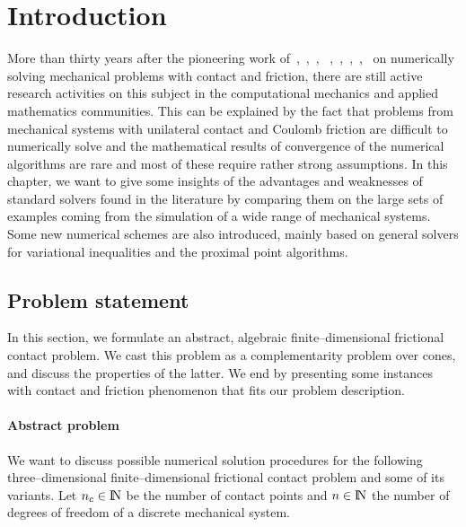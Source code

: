 \section{Introduction}



More than thirty years after the pioneering work of~\cite{Panagiotopoulos_IA1975},~\cite{Necas.ea1980},~\cite{Haslinger1983,Haslinger1984,Haslinger.Panagiotopoulos_PRSE1984}, ~\cite{z-DelPieroMaceri_CISM1983,z-DelPieroMaceri_CISM1985},~\cite{Katona_IJNAMG1983},~\cite{Chaudhary.Bathe_CS1986},~\cite{Jean.Moreau1987},~\cite{Mitsopoulou.Doudoumis1988} on numerically solving mechanical problems with contact and friction, there are still active research activities on this subject in the computational mechanics and applied mathematics communities.  This can be explained by the fact that {problems from} mechanical systems with unilateral contact and Coulomb friction are difficult to numerically solve and the mathematical results of convergence of the numerical algorithms are rare and most of these require rather strong assumptions. In this chapter, we want to give some insights of the advantages and weaknesses of standard solvers found in the literature by comparing them on the large sets of examples coming from the simulation of a wide range of mechanical systems. Some new numerical schemes are also introduced, mainly based on general solvers for variational inequalities and the proximal point algorithms.

\subsection{Problem statement}
In this section, we formulate an abstract, algebraic finite--dimensional frictional contact problem. We cast this problem as a complementarity problem over cones, and discuss the properties of the latter.
We end by presenting some instances with contact and friction phenomenon that fits our problem description.

\paragraph{Abstract problem}

We want to discuss possible numerical solution procedures for the following three--dimensional finite--dimensional frictional contact problem and some of its variants.  Let $n_c\in \mathrm{I\!N}$ be the number of contact points and $n\in\mathrm{I\!N}$ the number of degrees of freedom of a discrete mechanical system.

